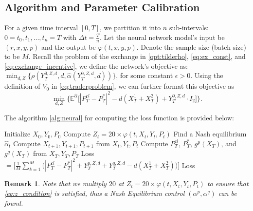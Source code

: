 \documentclass[12pt]{article}
\newtheorem{remark}[theorem2]{Remark}
\begin{document}

\subsection{Algorithm and Parameter Calibration}

For a given time interval $[0, T]$, we partition it into $n$ sub-intervals: $0 = t_0, t_1, \dots, t_n = T$ with $\Delta t = \frac{T}{n}$. Let the neural network model's input be $(r, x, y, p)$ and the output be $\varphi(t, x, y, p)$. Denote the sample size (batch size) to be $M$. Recall the problem of the exchange in \eqref{opt:tilderho}, \eqref{eq:ex_const}, and \eqref{eq:exchange_incentive}, we define the  network’s objective as: $\min_{d,Z} \bigr\{\rho(Y_T^{0,Z,d},d,\hat\alpha(Y_T^{0,Z,d},d)) \bigr\}$, for some constant $\epsilon>0$. Using the definition of $V_0$ in \eqref{eq:traderproblem}, we can further format this objective as \[\min_{d,Z} \bigr\{\mathbb{E}^{\hat \alpha}\big[|P^{cl}_T - P_T^{*}|^2 - d(X_T^1 + X_T^2)+ Y_T^{0,Z,d} \cdot I_2\big]  \bigr\}.\]  


The algorithm \ref{alg:neural} for computing the loss function is provided below:

\begin{algorithm} 
\caption{Loss Function of the Neural Network}
\begin{algorithmic}[1] %
    \STATE Initialize $X_0, Y_0, P_0$
        \STATE Compute $Z_t = 20\times \varphi(t,X_t,Y_t,P_t)$
        \STATE Find a Nash equilibrium $\hat \alpha_t$
        \STATE Compute $X_{t+1}, Y_{t+1}, P_{t+1}$ from $X_{t}, Y_{t}, P_{t}$  
    \ENDFOR
    \STATE Compute $P_T^{cl}$, $P_T^{*}$, $g^p(X_T)$, and $g^q(X_T)$ from $X_{T}, Y_{T}, P_{T}$
    \STATE Loss $=  \Big[\frac{1}{M}\sum_{k=1}^M \Big(|P^{cl}_T - P_T^{*}|^2 + Y_T^{p,Z,d} + Y_T^{q,Z,d} - d(X_T^1 + X_T^2)\Big)\Big] $
    \RETURN Loss
\end{algorithmic}\label{alg:neural}
\end{algorithm}

\begin{remark}
    Note that we multiply $20$ at $Z_t = 20\times \varphi(t,X_t,Y_t,P_t)$ to ensure that \eqref{eq:z_condition} is satisfied, thus a Nash Equilibrium control $(\alpha^p, \alpha^q)$ can be found.
\end{remark}
\end{document}
